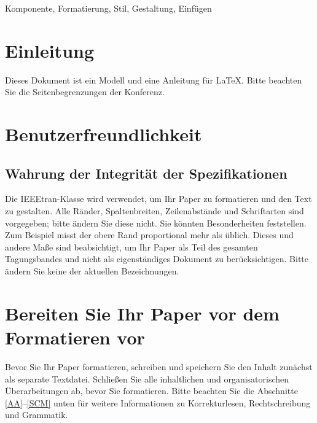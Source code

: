 \documentclass[conference]{IEEEtran}
\begin{document}
\begin{abstract}
Dieses Dokument ist ein Modell und eine Anleitung für \LaTeX.
Dieses und die Datei IEEEtran.cls definieren die Komponenten Ihres Papers [Titel, Text, Überschriften usw.]. *WICHTIG: Keine Symbole, Sonderzeichen, Fußnoten
oder Mathematik im Titel oder Abstract verwenden.
\end{abstract}

\begin{IEEEkeywords}
Komponente, Formatierung, Stil, Gestaltung, Einfügen
\end{IEEEkeywords}

\section{Einleitung}
Dieses Dokument ist ein Modell und eine Anleitung für \LaTeX.
Bitte beachten Sie die Seitenbegrenzungen der Konferenz.

\section{Benutzerfreundlichkeit}

\subsection{Wahrung der Integrität der Spezifikationen}

Die IEEEtran-Klasse wird verwendet, um Ihr Paper zu formatieren und den Text zu gestalten. Alle Ränder,
Spaltenbreiten, Zeilenabstände und Schriftarten sind vorgegeben; bitte ändern Sie diese nicht.
Sie könnten Besonderheiten feststellen. Zum Beispiel misst der obere Rand
proportional mehr als üblich. Dieses und andere Maße sind beabsichtigt, um Ihr Paper
als Teil des gesamten Tagungsbandes und nicht als eigenständiges Dokument zu berücksichtigen.
Bitte ändern Sie keine der aktuellen Bezeichnungen.

\section{Bereiten Sie Ihr Paper vor dem Formatieren vor}
Bevor Sie Ihr Paper formatieren, schreiben und speichern Sie den Inhalt zunächst als
separate Textdatei. Schließen Sie alle inhaltlichen und organisatorischen Überarbeitungen ab, bevor
Sie formatieren. Bitte beachten Sie die Abschnitte \ref{AA}--\ref{SCM} unten für weitere Informationen zu
Korrekturlesen, Rechtschreibung und Grammatik.
\end{document}
